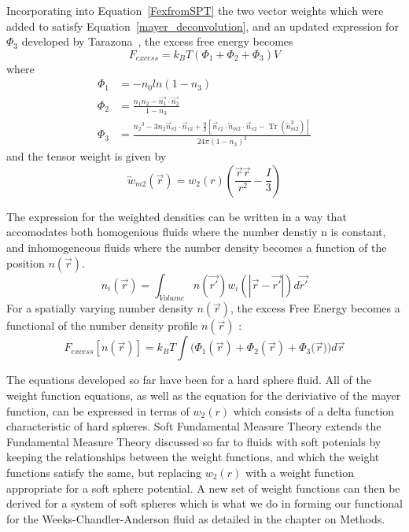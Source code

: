 \documentclass[double,12pt]{beavtex}
\begin{document}
Incorporating into Equation~\ref{FexfromSPT} the two vector weights which 
were added to satisfy Equation~\ref{mayer_deconvolution}, and an updated 
expression for $\Phi_3$ developed by Tarazona~\cite{tarazonaphi3, santos2012phi3}, 
the excess free energy becomes
\begin{equation}{F_{excess} = k_BT(\Phi_1+\Phi_2+\Phi_3)V}\end{equation}
where
\begin{align}
\Phi_1 &= -n_{0}ln(1-n_{3}) \label{eq:Phi1}\\
\Phi_2 &= \frac{n_{1}n_{2}-\vec{n_{1}}\cdot\vec{n_{2}}}{1-n_{3}} \label{eq:Phi2} \\
\Phi_3 &= \frac{{n_2}^3-3n_2\vec{n}_{v2}\cdot\vec{n}_{v2}+\frac{9}{2}[\vec{n}_{v2}\cdot{\overleftrightarrow{n}_{m2}}\cdot{\vec{n}_{v2}}-\operatorname{Tr}({\overleftrightarrow{n}^3_{m2}})]}{24\pi(1-n_3)^2}  \label{eq:Phi3}
\end{align}
and the tensor weight is given by
\begin{equation}\label{eq:tensorweight}{\overleftrightarrow{w}_{m2}(\vec{r})=w_2(r)\left(\frac{\vec{r}\vec{r}}{r^2}-\frac{I}{3}\right)}\end{equation} 

The expression for the weighted densities can be written in a way that 
accomodates both homogenious fluids where the number denstiy n is constant, 
and inhomogeneous fluids where the number density becomes a function of 
the position $n(\vec{r})$.
\begin{equation}{n_i(\vec{r})=\int_{Volume}{n(\vec{r'})w_i(|\vec{r}-\vec{r'}|)d{\vec{r'}}}}\end{equation}
For a spatially varying number density $n(\vec{r})$, the excess Free 
Energy becomes a functional of the number density profile $n(\vec{r})$ :
\begin{equation}\label{eq:F_ex-n-of-r}{F_{excess}[n(\vec{r})]= k_BT\int(\Phi_1(\vec{r})+\Phi_2(\vec{r})+\Phi_3(\vec{r}{)) d}\vec{r}}\end{equation} 

The equations developed so far have been for a hard sphere fluid. All of 
the weight function equations, as well as the equation for the deriviative 
of the mayer function, can be expressed in terms of $w_{2}(r)$ which consists 
of a delta function characteristic of hard spheres. Soft Fundamental Measure 
Theory extends the Fundamental Measure Theory discussed so far to 
fluids with soft potenials by keeping the relationships between the weight 
functions, and which the weight functions satisfy the same, but replacing 
$w_{2}(r)$ with a weight function appropriate for a soft sphere potential. 
A new set of weight functions can then be derived for a system of soft 
spheres which is what we do in forming our functional for the 
Weeks-Chandler-Anderson fluid as detailed in the chapter on Methods.
\end{document}

